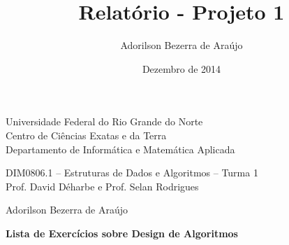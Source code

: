 \documentclass[12pt]{article}
\title{Relatório - Projeto 1}
\author{Adorilson Bezerra de Araújo}
\date{Dezembro de 2014}
\begin{document}
\begin{center}
{\large\sc Universidade Federal do Rio Grande do Norte} \\
{\large\sc Centro de Ciências Exatas e da Terra} \\
{\large\sc Departamento de Informática e Matemática Aplicada}

\vspace*{0.5cm}

{\sc DIM0806.1 -- Estruturas de Dados e Algoritmos -- Turma 1}\\
{\sc Prof. David Déharbe e Prof. Selan Rodrigues}

\vspace*{0.2cm}

{\sc Adorilson Bezerra de Araújo}

\vspace*{0.2cm}

{\bf Lista de Exercícios sobre Design de Algoritmos}
\end{center}








\end{document}
